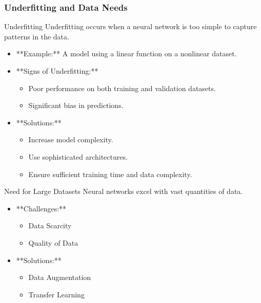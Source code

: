 \documentclass[aspectratio=169]{beamer}
\begin{document}
\begin{frame}[fragile]
    \frametitle{Underfitting and Data Needs}
    \begin{block}{Underfitting}
        Underfitting occurs when a neural network is too simple to capture patterns in the data.
    \end{block}
    \begin{itemize}
        \item **Example:**
        A model using a linear function on a nonlinear dataset.
        
        \item **Signs of Underfitting:**
        \begin{itemize}
            \item Poor performance on both training and validation datasets.
            \item Significant bias in predictions.
        \end{itemize}
        
        \item **Solutions:**
        \begin{itemize}
            \item Increase model complexity.
            \item Use sophisticated architectures.
            \item Ensure sufficient training time and data complexity.
        \end{itemize}
    \end{itemize}
    
    \begin{block}{Need for Large Datasets}
        Neural networks excel with vast quantities of data.
    \end{block}
    \begin{itemize}
        \item **Challenges:**
        \begin{itemize}
            \item Data Scarcity
            \item Quality of Data
        \end{itemize}
        
        \item **Solutions:**
        \begin{itemize}
            \item Data Augmentation
            \item Transfer Learning
        \end{itemize}
    \end{itemize}
\end{frame}
\end{document}
